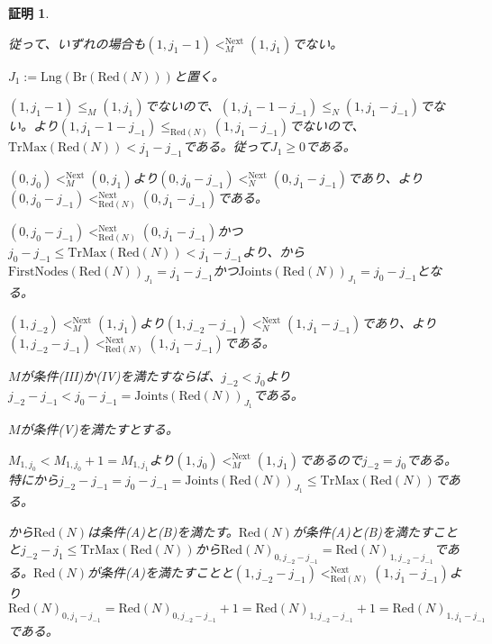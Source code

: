 \documentclass[dvipdfmx,uplatex]{jsarticle}
\theoremstyle{customnonumberbreakfortheorem}
\theoremstyle{customnonumberbreakforproof}
\newtheorem{hideableproof}{証明}
\begin{document}
\begin{hideableproof}
\begin{indented}
		\item 従って、いずれの場合も\((1,j_1-1) <_M^{\textrm{Next}} (1,j_1)\)でない。
		\item \(J_1 := \textrm{Lng}(\textrm{Br}(\textrm{Red}(N)))\)と置く。
		\item \((1,j_1-1) \leq_M (1,j_1)\)でないので、\((1,j_1-1-j_{-1}) \leq_N (1,j_1-j_{-1})\)でない。より\((1,j_1-1-j_{-1}) \leq_{\textrm{Red}(N)} (1,j_1-j_{-1})\)でないので、\(\textrm{TrMax}(\textrm{Red}(N)) < j_1-j_{-1}\)である。従って\(J_1 \geq 0\)である。
		\item \((0,j_0) <_M^{\textrm{Next}} (0,j_1)\)より\((0,j_0-j_{-1}) <_N^{\textrm{Next}} (0,j_1-j_{-1})\)であり、より\((0,j_0-j_{-1}) <_{\textrm{Red}(N)}^{\textrm{Next}} (0,j_1-j_{-1})\)である。
		\item \((0,j_0-j_{-1}) <_{\textrm{Red}(N)}^{\textrm{Next}} (0,j_1-j_{-1})\)かつ\(j_0-j_{-1} \leq \textrm{TrMax}(\textrm{Red}(N)) < j_1-j_{-1}\)より、から\(\textrm{FirstNodes}(\textrm{Red}(N))_{J_1} = j_1-j_{-1}\)かつ\(\textrm{Joints}(\textrm{Red}(N))_{J_1} = j_0-j_{-1}\)となる。
		\item \((1,j_{-2}) <_M^{\textrm{Next}} (1,j_1)\)より\((1,j_{-2}-j_{-1}) <_N^{\textrm{Next}} (1,j_1-j_{-1})\)であり、より\((1,j_{-2}-j_{-1}) <_{\textrm{Red}(N)}^{\textrm{Next}} (1,j_1-j_{-1})\)である。
		\item \(M\)が条件(III)か(IV)を満たすならば、\(j_{-2} < j_0\)より\(j_{-2}-j_{-1} < j_0-j_{-1} = \textrm{Joints}(\textrm{Red}(N))_{J_1}\)である。
		\item \(M\)が条件(V)を満たすとする。
		\begin{indented}
			\item \(M_{1,j_0} < M_{1,j_0}+1 = M_{1,j_1}\)より\((1,j_0) <_M^{\textrm{Next}} (1,j_1)\)であるので\(j_{-2} = j_0\)である。特にから\(j_{-2}-j_{-1} = j_0-j_{-1} = \textrm{Joints}(\textrm{Red}(N))_{J_1} \leq \textrm{TrMax}(\textrm{Red}(N))\)である。
			\item {}から\(\textrm{Red}(N)\)は条件(A)と(B)を満たす。\(\textrm{Red}(N)\)が条件(A)と(B)を満たすことと\(j_{-2}-j_1  \leq \textrm{TrMax}(\textrm{Red}(N))\)から\(\textrm{Red}(N)_{0,j_{-2}-j_{-1}} = \textrm{Red}(N)_{1,j_{-2}-j_{-1}}\)である。\(\textrm{Red}(N)\)が条件(A)を満たすことと\((1,j_{-2}-j_{-1}) <_{\textrm{Red}(N)}^{\textrm{Next}} (1,j_1-j_{-1})\)より\(\textrm{Red}(N)_{0,j_1-j_{-1}} = \textrm{Red}(N)_{0,j_{-2}-j_{-1}}+1 = \textrm{Red}(N)_{1,j_{-2}-j_{-1}}+1 = \textrm{Red}(N)_{1,j_1-j_{-1}}\)である。

\end{indented}
\end{indented}
\end{hideableproof}
\end{document}
